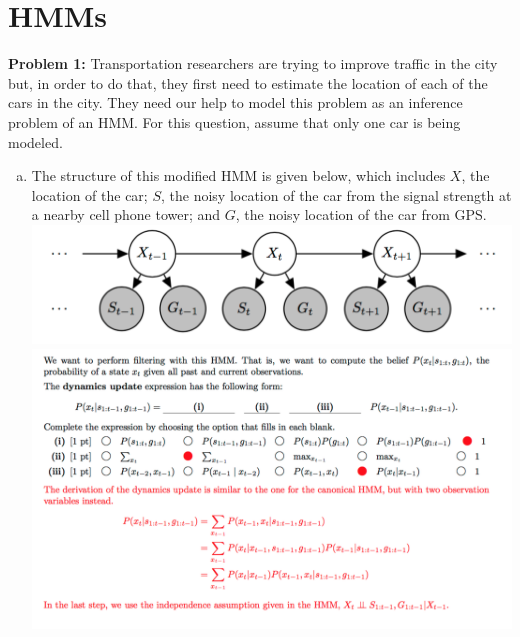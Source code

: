 \documentclass[a4paper]{article}
\newif\ifsol
\begin{document}
\section{HMMs}
    \textbf{Problem 1:} Transportation researchers are trying to improve traffic in the city but, in order to do that, they first need to estimate the location of each of the cars in the city. They need our help to model this problem as an inference problem of an HMM. For this question, assume that only one car is being modeled.\\
    \begin{enumerate}[a)]
        \item The structure of this modified HMM is given below, which includes $X$, the location of the car; $S$, the noisy location of the car from the signal strength at a nearby cell phone tower; and $G$, the noisy location of the car from GPS.\\
        \includegraphics[scale=0.5]{figs/hmm.png}\\
        \ifsol
            \includegraphics[scale=0.58]{figs/dynamicssolution.png}\\

\end{enumerate}
\end{document}
